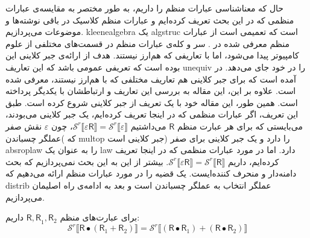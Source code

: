 حال که معناشناسی عبارات منظم را داریم، به طور مختصر به مقایسه‌ی عبارات منظمی که در این بحث تعریف کرده‌ایم و عبارات منظم کلاسیک در باقی نوشته‌ها و موضوعات می‌پردازیم. \gls{kleenealgebra} یک  \gls*{algstruc} است که تعمیمی است از عبارات منظم معرفی شده در \cite{kleene56}. سر و کله‌ی عبارات منظم در قسمت‌های مختلفی از علوم کامپیوتر پیدا می‌شود، اما با تعاریفی که هم‌ارز نیستند. هدف از ارائه‌ی جبر کلاینی این بوده است که تعریفی عمومی باشد که این تعاریف \gls*{unequiv} را در خود جای می‌دهد. در \cite{DexterKleene} آمده است که برای جبر کلاینی هم تعاریف مختلفی که با هم‌ارز نیستند، معرفی شده است. علاوه بر این، این مقاله به بررسی این تعاریف و ارتباطشان با یکدیگر پرداخته است. همین طور، این مقاله خود با یک تعریف از جبر کلاینی شروع کرده است. طبق این تعریف، اگر عبارات منظمی که در اینجا تعریف کرده‌ایم، یک جبر کلاینی می‌بودند، می‌بایستی که برای هر عبارت منظم $\mathsf{R}$ می‌داشتیم
$\mathcal{S}^r \llbracket \mathsf{\varepsilon R} \rrbracket = \mathcal{S}^r \llbracket \mathsf{\varepsilon} \rrbracket$،
چون $\varepsilon$ نقش صفر عملگر چسباندن( که \gls*{multop} جبر کلاینی است) را دارد و یک جبر کلاینی برای صفر \gls*{absroplaw} را به عنوان یک \gls*{law} دارد. اما در مورد عبارات منظمی که در اینجا تعریف کرده‌ایم، داریم 
$\mathcal{S}^r \llbracket \mathsf{\varepsilon R} \rrbracket = \mathcal{S}^r \llbracket \mathsf{R} \rrbracket$.
بیشتر از این به این بحث نمی‌پردازیم که بحث دامنه‌دار و منحرف کننده‌ایست. یک قضیه را در مورد عبارات منظم ارائه می‌دهیم که \gls*{distrib} عملگر انتخاب به عملگر چسباندن است و بعد به ادامه‌ی راه اصلیمان می‌پردازیم.
\begin{thm}
	برای عبارت‌های منظم
	 $\mathsf{R , R}_1,\mathsf{R}_2$
	 داریم:
	  $$\mathcal{S}^r \llbracket \mathsf{R}\bullet (\mathsf{R}_1 + \mathsf{R}_2) \rrbracket = \mathcal{S}^r \llbracket (\mathsf{R \bullet R}_1) + (\mathsf{R \bullet R}_2) \rrbracket $$
\end{thm}

